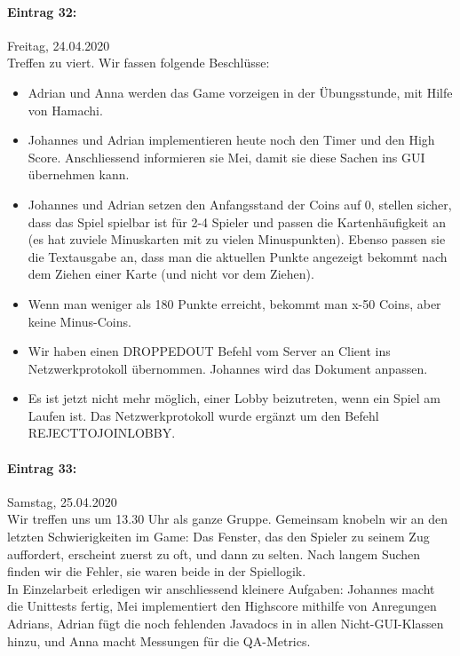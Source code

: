 \documentclass[12pt]{article}
\begin{document}
\paragraph{Eintrag 32:}
Freitag, 24.04.2020\\
Treffen zu viert. Wir fassen folgende Beschl\"usse:
\begin{itemize}
\item Adrian und Anna werden das Game vorzeigen in der \"Ubungsstunde, mit Hilfe von Hamachi.
\item Johannes und Adrian implementieren heute noch den Timer und den High Score. Anschliessend informieren sie Mei, damit sie diese Sachen ins GUI \"ubernehmen kann.
\item Johannes und Adrian setzen den Anfangsstand der Coins auf 0, stellen sicher, dass das Spiel spielbar ist f\"ur 2-4 Spieler und passen die Kartenh\"aufigkeit an (es hat zuviele Minuskarten mit zu vielen Minuspunkten). Ebenso passen sie die Textausgabe an, dass man die aktuellen Punkte angezeigt bekommt nach dem Ziehen einer Karte (und nicht vor dem Ziehen).
\item Wenn man weniger als 180 Punkte erreicht, bekommt man x-50 Coins, aber keine Minus-Coins.
\item Wir haben einen DROPPEDOUT Befehl vom Server an Client ins Netzwerkprotokoll \"ubernommen. Johannes wird das Dokument anpassen.
\item Es ist jetzt nicht mehr m\"oglich, einer Lobby beizutreten, wenn ein Spiel am Laufen ist. Das Netzwerkprotokoll wurde erg\"anzt um den Befehl REJECTTOJOINLOBBY.
\end{itemize}

\paragraph{Eintrag 33:}
Samstag, 25.04.2020\\
Wir treffen uns um 13.30 Uhr als ganze Gruppe. Gemeinsam knobeln wir an den letzten Schwierigkeiten im Game: Das Fenster, das den Spieler zu seinem Zug auffordert, erscheint zuerst zu oft, und dann zu selten. Nach langem Suchen finden wir die Fehler, sie waren beide in der Spiellogik.\\
In Einzelarbeit erledigen wir anschliessend kleinere Aufgaben: Johannes macht die Unittests fertig, Mei implementiert den Highscore mithilfe von Anregungen Adrians, Adrian f\"ugt die noch fehlenden Javadocs in in allen Nicht-GUI-Klassen hinzu, und Anna macht Messungen f\"ur die QA-Metrics.
\end{document}
